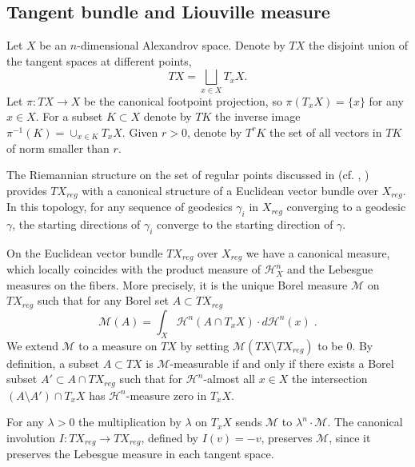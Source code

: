\documentclass[12pt,leqno]{amsart}
\numberwithin{equation}{section}
\theoremstyle{definition}
\theoremstyle{remark}
\def\:{\colon}
\begin{document}
\subsection{Tangent bundle and Liouville measure} \label{subsec:tb}
Let $X$ be an $n$-dimensional Alexandrov space.
Denote by $TX$ the  disjoint union of the tangent spaces at different points,
\[TX=\bigsqcup_{x\in X} T_x X.\]
Let $\pi\:TX\to X$ be the canonical footpoint projection, so $\pi (T_xX)=\{x\}$ for any $x\in X$.
For a subset $K\subset X$ denote by $TK$ the inverse image $\pi^{-1} (K)= \cup _{x\in K} T_xX$. Given $r>0$, denote by $T^r K$ the set of all vectors in $TK$
	of norm smaller than $r$.

 The  Riemannian structure on the set of regular points discussed in  \cite{Otsu-Shioya}  (cf.  \cite{Shioya}, \cite{Per-DC}) provides  $TX_{reg}$ with a canonical structure of a Euclidean vector bundle over $X_{reg}$. In this topology, for any sequence of geodesics $\gamma _i$ in $X_{reg}$ converging to a geodesic $\gamma$, the starting directions of $\gamma _i$ converge to the starting direction of $\gamma$.

 On the Euclidean vector bundle $TX_{reg}$ over $X_{reg}$ we have a canonical measure, which locally coincides with the product measure of $\mathcal H^n _X$ and the Lebesgue measures on the fibers. More precisely,
 it is the unique Borel measure $\mathcal M$ on $TX_{reg}$ such that for any  Borel set $A\subset TX_{reg}$
 $$\mathcal M(A)= \int _X \mathcal H^n(A \cap T_x X) \cdot d\mathcal H^n (x) \; .$$
 We extend $\mathcal M$ to a measure on $TX$ by setting $\mathcal M(TX\setminus TX_{reg})$ to be $0$.
By definition, a subset $A\subset TX$ is $\mathcal M$-measurable if and only if there exists  a Borel subset $A'\subset A\cap TX_{reg}$ such that
for $\mathcal H^n$-almost all $x\in X$ the intersection $(A\setminus A') \cap T_xX$ has $\mathcal H^n$-measure zero in $T_xX$.




 For any $\lambda >0$ the multiplication by $\lambda$  on  $T_xX$ sends $\mathcal M $ to $\lambda ^n \cdot \mathcal M$.
The canonical involution $I\:TX_{reg}\to TX_{reg}$, defined by $I(v)=-v$,
 preserves $\mathcal M$, since it preserves the Lebesgue measure in each tangent space.
\end{document}
